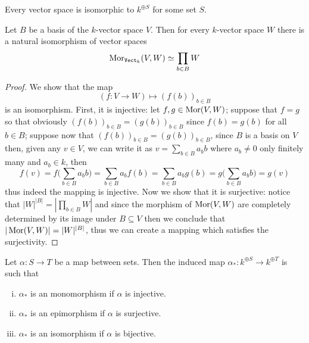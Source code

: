 \begin{corollary}
    Every vector space is isomorphic to \(k^{\oplus S}\) for some set \(S\).
\end{corollary}

\begin{proposition}
    Let \(B\) be a basis of the \(k\)-vector space \(V\). Then for every
    \(k\)-vector space \(W\) there is a natural isomorphism of vector spaces
    \[
        \operatorname{Mor}_{{\texttt{Vect}}_k}(V, W) \simeq \prod_{b \in B} W
    \]
\end{proposition}

\begin{proof}
    We show that the map
    \[
        (f: V \to W) \longmapsto (f(b))_{b \in B}
    \]
    is an isomorphism. First, it is injective: let \(f, g \in \operatorname{Mor}(V, W)\);
    suppose that \(f = g\) so that obviously \((f(b))_{b \in B} = (g(b))_{b \in
            B}\) since \(f(b) = g(b)\) for all \(b \in B\); suppose now that \((f(b))_{b
            \in B} = (g(b))_{b \in B}\), since \(B\) is a basis on \(V\) then, given any
    \(v \in V\), we can write it as \(v = \sum_{b \in B} a_b b\) where \(a_b \neq
    0\) only finitely many and \(a_b \in k\), then
    \[
        f(v) = f\bigg(\sum_{b \in B} a_b b\bigg) = \sum_{b \in B} a_b f(b)
        = \sum_{b \in B} a_b g(b) = g\bigg(\sum_{b \in B} a_b b\bigg) = g(v)
    \]
    thus indeed the mapping is injective. Now we show that it is surjective:
    notice that \(|W|^{|B|} = \left| \prod_{b \in B} W \right|\) and since the
    morphism of \(\operatorname{Mor}(V, W)\) are completely determined by its image under \(B
    \subseteq V\) then we conclude that \(|\operatorname{Mor}(V, W)| = |W|^{|B|}\), thus we can
    create a mapping which satisfies the surjectivity.
\end{proof}

\begin{proposition}
    Let \(\alpha : S \to T\) be a map between sets. Then the induced map
    \(\alpha_\ast : k^{\oplus S} \to k^{\oplus T}\) is such that
    \begin{enumerate}[i.]
        \item \(\alpha_\ast\) is an monomorphism if \(\alpha\) is injective.
        \item \(\alpha_\ast\) is an epimorphism if \(\alpha\) is surjective.
        \item \(\alpha_\ast\) is an isomorphism if \(\alpha\) is bijective.
    \end{enumerate}
\end{proposition}

